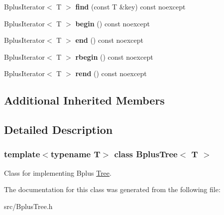 \begin{DoxyCompactItemize}
\mbox{\label{classBplusTree_a367ff479947c9103abc781db035a49ee}} 
Bplus\+Iterator$<$ T $>$ {\bfseries find} (const T \&key) const noexcept
\item 
\mbox{\label{classBplusTree_af25d2c310a013718a1d54e8993bf7b76}} 
Bplus\+Iterator$<$ T $>$ {\bfseries begin} () const noexcept
\item 
\mbox{\label{classBplusTree_ac217ed576ff9495e2fd90f5d13f34065}} 
Bplus\+Iterator$<$ T $>$ {\bfseries end} () const noexcept
\item 
\mbox{\label{classBplusTree_a96798aee453828de98c3eba8a6507915}} 
Bplus\+Iterator$<$ T $>$ {\bfseries rbegin} () const noexcept
\item 
\mbox{\label{classBplusTree_a048e70503ad677508b75cb845d125b93}} 
Bplus\+Iterator$<$ T $>$ {\bfseries rend} () const noexcept
\end{DoxyCompactItemize}
\subsection*{Additional Inherited Members}


\subsection{Detailed Description}
\subsubsection*{template$<$typename T$>$\newline
class Bplus\+Tree$<$ T $>$}

Class for implementing Bplus \hyperlink{classTree}{Tree}. 

The documentation for this class was generated from the following file\+:\begin{DoxyCompactItemize}
\item 
src/Bplus\+Tree.\+h\end{DoxyCompactItemize}
